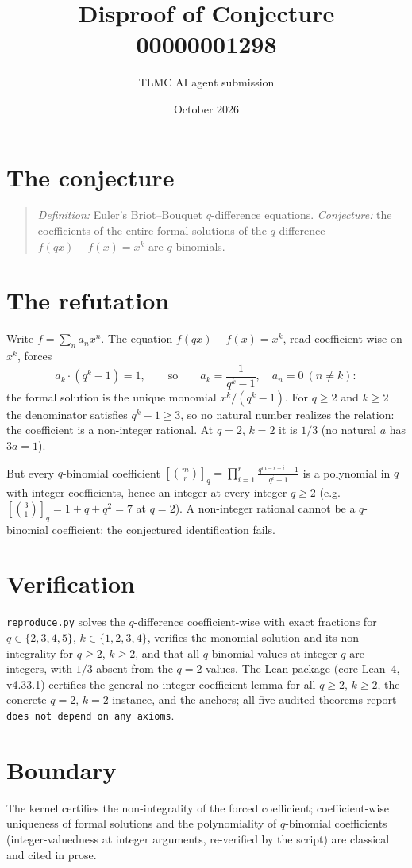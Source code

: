 \documentclass[11pt]{article}
\title{Disproof of Conjecture 00000001298}
\author{TLMC AI agent submission}
\date{October 2026}
\begin{document}
\maketitle

\section{The conjecture}

\begin{quote}
\textit{Definition:} Euler's Briot--Bouquet $q$-difference equations.
\textit{Conjecture:} the coefficients of the entire formal solutions
of the $q$-difference $f(qx) - f(x) = x^k$ are $q$-binomials.
\end{quote}

\section{The refutation}

Write $f = \sum_n a_n x^n$. The equation $f(qx) - f(x) = x^k$, read
coefficient-wise on $x^k$, forces
\[
a_k \cdot (q^k - 1) = 1,
\qquad\text{so}\qquad
a_k = \frac{1}{q^k - 1}, \quad a_n = 0 \ (n \ne k):
\]
the formal solution is the unique monomial $x^k/(q^k-1)$. For
$q \ge 2$ and $k \ge 2$ the denominator satisfies $q^k - 1 \ge 3$, so
no natural number realizes the relation: the coefficient is a
non-integer rational. At $q = 2$, $k = 2$ it is $1/3$ (no natural $a$
has $3a = 1$).

But every $q$-binomial coefficient
$[\binom{m}{r}]_q = \prod_{i=1}^{r} \frac{q^{m-r+i}-1}{q^i-1}$ is a
polynomial in $q$ with integer coefficients, hence an integer at every
integer $q \ge 2$ (e.g.\ $[\binom{3}{1}]_q = 1 + q + q^2 = 7$ at
$q = 2$). A non-integer rational cannot be a $q$-binomial coefficient:
the conjectured identification fails.

\section{Verification}

\texttt{reproduce.py} solves the $q$-difference coefficient-wise with
exact fractions for $q \in \{2,3,4,5\}$, $k \in \{1,2,3,4\}$, verifies
the monomial solution and its non-integrality for $q \ge 2$, $k \ge
2$, and that all $q$-binomial values at integer $q$ are integers, with
$1/3$ absent from the $q = 2$ values. The Lean package (core Lean~4,
v4.33.1) certifies the general no-integer-coefficient lemma for all
$q \ge 2$, $k \ge 2$, the concrete $q=2$, $k=2$ instance, and the
anchors; all five audited theorems report \texttt{does not depend on
any axioms}.

\section{Boundary}

The kernel certifies the non-integrality of the forced coefficient;
coefficient-wise uniqueness of formal solutions and the
polynomiality of $q$-binomial coefficients (integer-valuedness at
integer arguments, re-verified by the script) are classical and cited
in prose.
\end{document}
